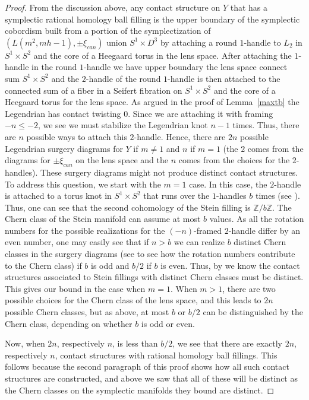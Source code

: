 \documentclass[11pt]{amsart}
\theoremstyle{plain}
\theoremstyle{definition}
\theoremstyle{remark}
\numberwithin{theorem}{section}
\newcommand{\Z}{\mathbb{Z}}           %
\begin{document}
\begin{proof}
From the discussion above, any contact structure on $Y$ that has a symplectic rational homology ball filling is the upper boundary of the symplectic cobordism built from a portion of the symplectization of $(L(m^2,mh-1), \pm \xi_{can})$ union $S^1\times D^3$ by attaching a round $1$-handle to $L_2$ in $S^1\times S^2$ and the core of a Heegaard torus in the lens space. After attaching the $1$-handle in the round $1$-handle we have upper boundary the lens space connect sum $S^1\times S^2$ and the $2$-handle of the round $1$-handle is then attached to the connected sum of a fiber in a Seifert fibration on $S^1\times S^2$ and the core of a Heegaard torus for the lens space. As argued in the proof of Lemma~\ref{maxtb} the Legendrian has contact twisting $0$. Since we are attaching it with framing $-n\leq -2$, we see we must stabilize the Legendrian knot $n-1$ times. Thus, there are $n$ possible ways to attach this $2$-handle. Hence, there are $2n$ possible Legendrian surgery diagrams for $Y$ if $m\not=1$ and $n$ if $m=1$ (the $2$ comes from the diagrams for $\pm \xi_{can}$ on the lens space and the $n$ comes from the choices for the $2$-handles). These surgery diagrams might not produce distinct contact structures. To address this question, we start with the $m=1$ case. In this case, the $2$-handle is attached to a torus knot in $S^1\times S^2$ that runs over the $1$-handles $b$ times (see \cite[Lemma~4.1]{EtnyreOzbagciTosun2025}). Thus, one can see that the second cohomology of the Stein filling is $\Z/b\Z$. The Chern class of the Stein manifold can assume at most $b$ values. As all the rotation numbers for the possible realizations for the $(-n)$-framed $2$-handle differ by an even number, one may easily see that if $n>b$ we can realize $b$ distinct Chern classes in the surgery diagrams (see \cite[Theorem~4.12]{Gompf98} to see how the rotation numbers contribute to the Chern class) if $b$ is odd and $b/2$ if $b$ is even. Thus, by \cite[Theorem~1.2]{LiscaMatic97} we know the contact structures associated to Stein fillings with distinct Chern classes must be distinct. This gives our bound in the case when $m=1$. When $m>1$, there are two possible choices for the Chern class of the lens space, and this leads to $2n$ possible Chern classes, but as above, at most $b$ or $b/2$ can be distinguished by the Chern class, depending on whether $b$ is odd or even. 

Now, when $2n$, respectively $n$, is less than $b/2$, we see that there are exactly $2n$, respectively $n$, contact structures with rational homology ball fillings. This follows because the second paragraph of this proof shows how all such contact structures are constructed, and above we saw that all of these will be distinct as the Chern classes on the symplectic manifolds they bound are distinct. 


\end{proof}
\end{document}

